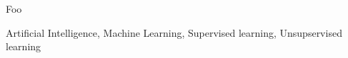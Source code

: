 


\maketitle






Foo


\begin{keywords}
Artificial Intelligence, Machine Learning, Supervised learning, Unsupservised learning
\end{keywords}

















